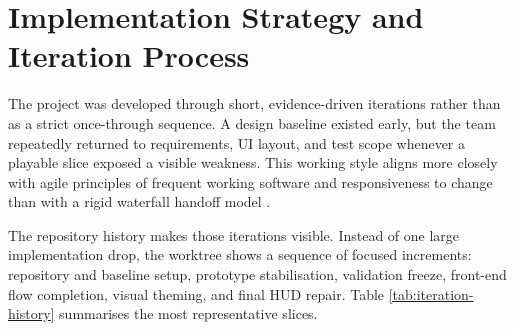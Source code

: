 \section{Implementation Strategy and Iteration Process}

The project was developed through short, evidence-driven iterations rather than as a strict once-through sequence. A design baseline existed early, but the team repeatedly returned to requirements, UI layout, and test scope whenever a playable slice exposed a visible weakness. This working style aligns more closely with agile principles of frequent working software and responsiveness to change than with a rigid waterfall handoff model \cite{agileManifesto2001,royce1970}.

The repository history makes those iterations visible. Instead of one large implementation drop, the worktree shows a sequence of focused increments: repository and baseline setup, prototype stabilisation, validation freeze, front-end flow completion, visual theming, and final HUD repair. Table \ref{tab:iteration-history} summarises the most representative slices.

